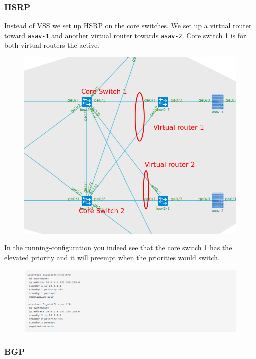 \documentclass{article}
\begin{document}
\newpage
\subsubsection{HSRP}
Instead of VSS we set up HSRP on the core switches.
We set up a virtual router toward \verb|asav-1| and another virtual router towards \verb|asav-2|.
Core switch 1 is for both virtual routers the active.

\begin{figure}[H]
	\centering
	\includegraphics[width=\textwidth]{images/Hsrp.png}
\end{figure}

In the running-configuration you indeed see that the core switch 1 has the elevated priority and it will preempt when the priorities would switch.

\begin{figure}[H]
	\centering
	\includegraphics[width=\textwidth]{images/Hsrp_conf.png}
\end{figure}


\newpage
\subsubsection{BGP}
\end{document}
